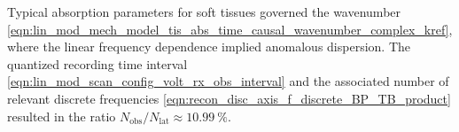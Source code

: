 Typical absorption parameters for
soft tissues
\cite[Table 4.20]{book:Duck1990} governed
the wavenumber
\eqref{eqn:lin_mod_mech_model_tis_abs_time_causal_wavenumber_complex_kref}, where
the linear frequency dependence implied
anomalous dispersion.
The quantized recording time interval
\eqref{eqn:lin_mod_scan_config_volt_rx_obs_interval} and
the associated number of
relevant discrete frequencies
\eqref{eqn:recon_disc_axis_f_discrete_BP_TB_product} resulted in
the ratio
$N_{\text{obs}} / N_{\text{lat}} \approx \SI{10.99}{\percent}$.
